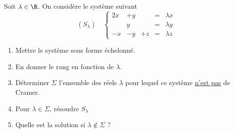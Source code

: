 




\begin{exercice}
Soit $\lambda \in \R$. On considère le système suivant 
$$(S_\lambda)\quad  \left\{ \begin{array}{ccccc}
2x &+y& & =& \lambda x\\
 &y & & =& \lambda y \\
 -x&-y&+z&=&\lambda z
\end{array}\right. $$

\begin{enumerate}
\item Mettre le système sous forme échelonné. 
\item En donner le rang en fonction de $\lambda$. 
\item Déterminer $\Sigma$ l'ensemble des réels $\lambda$ pour lequel ce système \underline{n'est pas} de Cramer. 
\item Pour $\lambda \in \Sigma$, résoudre $S_\lambda$
\item Quelle est la solution si $\lambda \notin \Sigma$ ? 
\end{enumerate}
\end{exercice}
